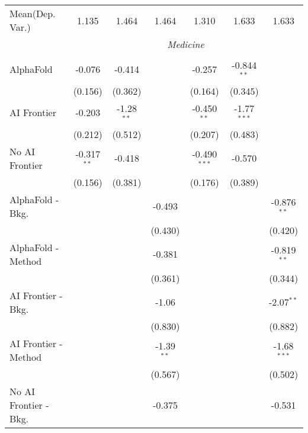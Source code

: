 \begin{tabular}{lcccccc}
Mean(Dep. Var.) & 1.135 & 1.464 & 1.464 & 1.310 & 1.633 & 1.633 \\
 & \multicolumn{6}{c}{\textit{Medicine}} \\ \\
   AlphaFold               & -0.076        & -0.414       &              & -0.257         & -0.844$^{**}$ &   \\   
                           & (0.156)       & (0.362)      &              & (0.164)        & (0.345)       &   \\   
   AI Frontier             & -0.203        & -1.28$^{**}$ &              & -0.450$^{**}$  & -1.77$^{***}$ &   \\   
                           & (0.212)       & (0.512)      &              & (0.207)        & (0.483)       &   \\   
   No AI Frontier          & -0.317$^{**}$ & -0.418       &              & -0.490$^{***}$ & -0.570        &   \\   
                           & (0.156)       & (0.381)      &              & (0.176)        & (0.389)       &   \\   
   AlphaFold - Bkg.        &               &              & -0.493       &                &               & -0.876$^{**}$\\   
                           &               &              & (0.430)      &                &               & (0.420)\\   
   AlphaFold - Method      &               &              & -0.381       &                &               & -0.819$^{**}$\\   
                           &               &              & (0.361)      &                &               & (0.344)\\   
   AI Frontier - Bkg.      &               &              & -1.06        &                &               & -2.07$^{**}$\\   
                           &               &              & (0.830)      &                &               & (0.882)\\   
   AI Frontier - Method    &               &              & -1.39$^{**}$ &                &               & -1.68$^{***}$\\   
                           &               &              & (0.567)      &                &               & (0.502)\\   
   No AI Frontier - Bkg.   &               &              & -0.375       &                &               & -0.531\\   

\end{tabular}
